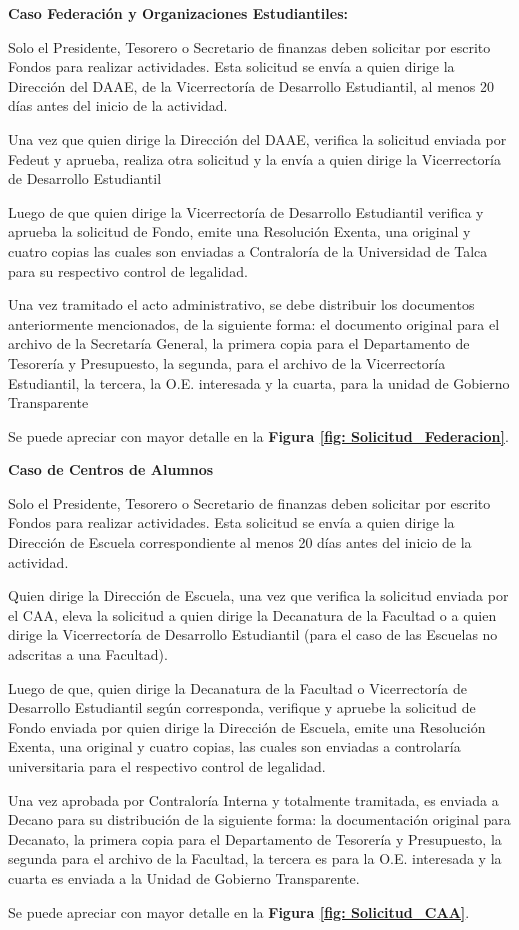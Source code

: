 \begin{tasks}[counter-format = {tsk[A].}]
	\task \textbf{Caso Federación y Organizaciones Estudiantiles:}

	Solo el Presidente, Tesorero o Secretario de finanzas deben solicitar por escrito Fondos para realizar actividades. Esta solicitud se envía a quien dirige la Dirección del DAAE, de la Vicerrectoría de Desarrollo Estudiantil, al menos 20 días antes del inicio de la actividad. 

	Una vez que quien dirige la Dirección del DAAE, verifica la solicitud enviada por Fedeut y aprueba, realiza otra solicitud y la envía a quien dirige la Vicerrectoría de Desarrollo Estudiantil

	Luego de que quien dirige la Vicerrectoría de Desarrollo Estudiantil verifica y aprueba la solicitud de Fondo, emite una Resolución Exenta, una original y cuatro copias las cuales son enviadas a Contraloría de la Universidad de Talca para su respectivo control de legalidad. 
	
	Una vez tramitado el acto administrativo, se debe distribuir los documentos anteriormente mencionados, de la siguiente forma: el documento original para el archivo de la Secretaría General, la primera copia para el Departamento de Tesorería y Presupuesto, la segunda, para el archivo de la Vicerrectoría Estudiantil, la tercera, la O.E. interesada y la cuarta, para la unidad de Gobierno Transparente 

	Se puede apreciar con mayor detalle en la \textbf{Figura \ref{fig: Solicitud_Federacion}}.

	\task \textbf{Caso de Centros de Alumnos}

	Solo el Presidente, Tesorero o Secretario de finanzas deben solicitar por escrito Fondos para realizar actividades. Esta solicitud se envía a quien dirige la Dirección de Escuela correspondiente al menos 20 días antes del inicio de la actividad. 

	Quien dirige la Dirección de Escuela, una vez que verifica la solicitud enviada por el CAA, eleva la solicitud a quien dirige la Decanatura de la Facultad o a quien dirige la Vicerrectoría de Desarrollo Estudiantil (para el caso de las Escuelas no adscritas a una Facultad).

	Luego de que, quien dirige la Decanatura de la Facultad o Vicerrectoría de Desarrollo Estudiantil según corresponda, verifique y apruebe la solicitud de Fondo enviada por quien dirige la Dirección de Escuela, emite una Resolución Exenta, una original y cuatro copias, las cuales son enviadas a controlaría universitaria para el respectivo control de legalidad.

	Una vez aprobada por Contraloría Interna y totalmente tramitada, es enviada a Decano para su distribución de la siguiente forma: la documentación original para Decanato, la primera copia para el Departamento de Tesorería y Presupuesto, la segunda para el archivo de la Facultad, la tercera es para la O.E. interesada y la cuarta es enviada a la Unidad de Gobierno Transparente.

	Se puede apreciar con mayor detalle en la \textbf{Figura \ref{fig: Solicitud_CAA}}.

\end{tasks}

